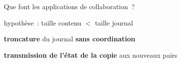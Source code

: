 \begin{frame}{Que font les applications de collaboration~?}
\begin{minipage}[c][.55\textheight][t]{\textwidth}
    \end{minipage}
    \begin{minipage}{\textwidth}
        \begin{compactitemize}
            \item hypothèse~: taille contenu $<$ taille journal
            \item \textbf{troncature} du journal \textbf{sans coordination}
            \item \textbf{transmission de l'état de la copie} aux nouveaux pairs
        \end{compactitemize}
    \end{minipage}
\end{frame}


